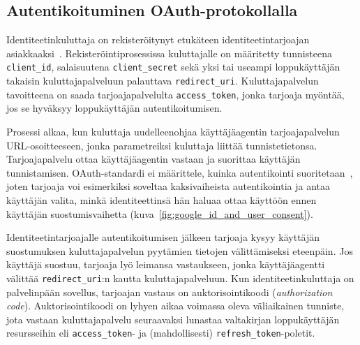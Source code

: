 \documentclass[finnish,gradu]{tktltiki}
\begin{document}





  \subsection{Autentikoituminen OAuth-protokollalla} %
  \label{ssub:autentikoituminen_oauth_protokollalla}

  Identiteetinkuluttaja on rekisteröitynyt etukäteen identiteetintarjoajan asiakkaaksi~\cite{google_oauth2_doc, facebook_oauth2_doc}. Rekisteröintiprosessissa kuluttajalle on määritetty tunnisteena \verb!client_id!, salaisuutena \verb!client_secret! sekä yksi tai useampi loppukäyttäjän takaisin kuluttajapalveluun palauttava \verb!redirect_uri!. Kuluttajapalvelun tavoitteena on saada tarjoajapalvelulta \verb!access_token!, jonka tarjoaja myöntää, jos se hyväksyy loppukäyttäjän autentikoitumisen.

  Prosessi alkaa, kun kuluttaja uudelleenohjaa käyttäjäagentin tarjoajapalvelun URL-osoitteeseen, jonka parametreiksi kuluttaja liittää tunnistetietonsa. Tarjoajapalvelu ottaa käyttäjäagentin vastaan ja suorittaa käyttäjän tunnistamisen. OAuth-standardi ei määrittele, kuinka autentikointi suoritetaan~\cite{ietf_oauth2}, joten tarjoaja voi esimerkiksi soveltaa kaksivaiheista autentikointia ja antaa käyttäjän valita, minkä identiteettinsä hän haluaa ottaa käyttöön ennen käyttäjän suostumisvaihetta (kuva~\ref{fig:google_id_and_user_consent}).

  Identiteetintarjoajalle autentikoitumisen jälkeen tarjoaja kysyy käyttäjän suostumuksen kuluttajapalvelun pyytämien tietojen välittämiseksi eteenpäin. Jos käyttäjä suostuu, tarjoaja lyö leimansa vastaukseen, jonka käyttäjäagentti välittää \verb!redirect_uri!:n kautta kuluttajapalveluun. Kun identiteetinkuluttaja on palvelinpään sovellus, tarjoajan vastaus on auktorisointikoodi (\emph{authorization code}). Auktorisointikoodi on lyhyen aikaa voimassa oleva väliaikainen tunniste, jota vastaan kuluttajapalvelu seuraavaksi lunastaa valtakirjan loppukäyttäjän resursseihin eli \verb!access_token!- ja (mahdollisesti) \verb!refresh_token!-poletit. %
\end{document}
